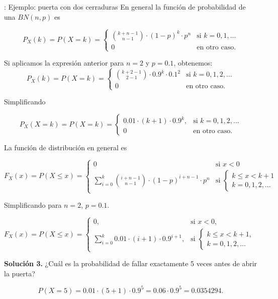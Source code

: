 \documentclass[
  letterpaper,
  DIV=11,
  numbers=noendperiod]{scrreprt}
\begin{document}
\begin{Ejemplo}{: Ejemplo: puerta con dos cerraduras}{}
En general la función de probabilidad de una \(BN(n,p)\) es

\[
P_X(k)=P(X=k)=
\left\{
\begin{array}{cc} 
{k+n-1\choose n-1} \cdot (1-p)^{k}\cdot p^n & \mbox{si } k=0,1,\ldots \\ 0 & \mbox{en otro caso.}\end{array}\right.
\]

Si aplicamos la expresión anterior para \(n=2\) y \(p=0.1\), obtenemos:
\[
P_X(k)=P(X=k)=
\left\{
\begin{array}{cc} 
{k+2-1\choose 2-1} \cdot 0.9^{k}\cdot 0.1^2 & \mbox{si } k=0,1,2,\ldots \\ 0 & \mbox{en otro caso.}\end{array}\right.
\]

Simplificando

\[
P_X(X=k)=P(X=k)=
\left\{
\begin{array}{cc} 
0.01\cdot (k+1)\cdot 0.9^{k}, & \mbox{si } k=0,1,2,\ldots \\ 0 & \mbox{en otro caso.}\end{array}\right.
\]

La función de distribución en general es

\[
F_X(x)=P(X\leq x)=
\left\{
\begin{array}{ll}
0 & \mbox{si } x<0 \\
\displaystyle\sum_{i=0}^{k }{i+n-1\choose n-1} \cdot (1-p)^{i+n-1}\cdot p^n 
& \mbox{si }\left\{\begin{array}{l} k\leq x< k+1\\k=0,1,2,\ldots\end{array}\right. 
\end{array}
\right.
\]

Simplificando para \(n=2\), \(p=0.1\).

\[
F_X(x)=P(X\leq x)=
\left\{
\begin{array}{ll}
0, & \mbox{si } x<0, \\
\displaystyle\sum_{i=0}^{k }0.01\cdot (i+1) \cdot 0.9^{i+1},
& \mbox{si }\left\{\begin{array}{l} k\leq x< k+1,\\k=0,1,2,\ldots\end{array}\right. 
\end{array}
\right.
\]

\textbf{Solución 3.} ¿Cuál es la probabilidad de fallar exactamente 5
veces antes de abrir la puerta?

\[
P(X=5)= 0.01\cdot (5+1) \cdot 0.9^{5}= 0.06 \cdot 0.9^{5}= 0.0354294.
\]


\end{Ejemplo}
\end{document}
